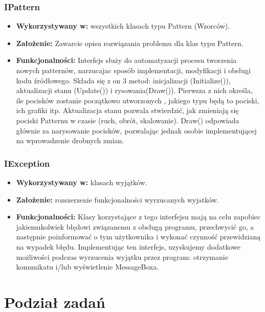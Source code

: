 \documentclass[a4paper,twoside]{article}
\begin{document}
\section{IPattern}

\begin{itemize}
\item \textbf{Wykorzystywany w:} wszystkich klasach typu Pattern (Wzorców).
\item \textbf{Założenie:} Zawarcie opisu rozwiązania problemu dla klas typu Pattern.
\item \textbf{Funkcjonalności:} Interfejs służy do automatyzacji procesu tworzenia nowych patternów, narzucajac sposób implementacji, modyfikacji i obsługi kodu źródłowego. Składa się z on 3 metod: inicjalizacji (Initialize()), aktualizacji stanu (Update()) i rysowania(Draw()). Pierwsza z nich określa, ile pocisków zostanie początkowo utworzonych , jakiego typu będą to pociski, ich grafiki itp. Aktualizacja stanu pozwala stwierdzić, jak zmieniają się pociski Patternu w czasie (ruch, obrót, skalowanie). Draw() odpowiada głównie za narysowanie pocisków, pozwalając jednak osobie implementującej na wprowadzenie drobnych zmian.
\end{itemize}

\section{IException}

\begin{itemize}
\item \textbf{Wykorzystywany w:} klasach wyjątków.
\item \textbf{Założenie:} rozszerzenie funkcjonalności wyrzucanych wyjatków.
\item \textbf{Funkcjonalności:} Klasy korzystające z tego interfejsu mają na celu zapobiec jakiemukolwiek błędowi związanemu z obsługą programu, przechwycić go, a następnie poinformować o tym użytkownika i wykonać czynność przewidzianą na wypadek błędu. Implementując ten interfejs, uzyskujemy dodatkowe możliwości podczas wyrzucenia wyjątku przez program: otrzymanie komunikatu i/lub wyświetlenie MessageBoxa. 
\end{itemize}

\newpage

\part{\huge \textbf{Podział zadań}}
\end{document}
